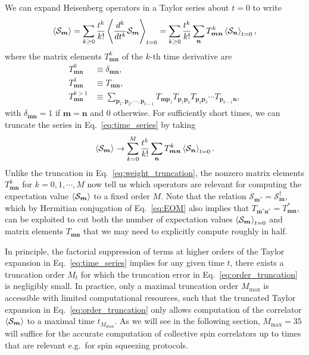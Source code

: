 \documentclass[pra,reprint,longbibliography]{revtex4-1}
\renewcommand{\t}{\text} %
\newcommand{\f}[2]{\dfrac{#1}{#2}} %
\renewcommand{\v}{\bm} %
\newcommand{\bk}{\Braket} %
\renewcommand{\S}{\mathcal{S}}
\newcommand{\1}{\mathds{1}}
\begin{document}
We can expand Heisenberg operators in a Taylor series about $t=0$ to
write
\begin{align}
  \bk{\S_{\v m}}
  = \sum_{k\ge0} \f{t^k}{k!} \bk{\f{d^k}{dt^k} \S_{\v m}}_{t=0}
  = \sum_{k\ge0} \f{t^k}{k!}
  \sum_{\v n} T^k_{\v m\v n} \bk{\S_{\v n}}_{t=0},
  \label{eq:time_series}
\end{align}
where the matrix elements $T^k_{\v m\v n}$ of the $k$-th time
derivative are
\begin{align}
  T^0_{\v m\v n} &\equiv \delta_{\v m\v n}, \\
  T^1_{\v m\v n} &\equiv T_{\v m\v n}, \\
  T^{k>1}_{\v m\v n}
  &\equiv \sum_{\v p_1,\v p_2,\cdots,\v p_{k-1}}
  T_{\v m\v p_1} T_{\v p_1\v p_2} T_{\v p_2\v p_3}
  \cdots T_{\v p_{k-1}\v n},
\end{align}
with $\delta_{\v m\v n}=1$ if $\v m=\v n$ and 0 otherwise.  For
sufficiently short times, we can truncate the series in
Eq.~\eqref{eq:time_series} by taking
\begin{align}
  \bk{\S_{\v m}}
  \to \sum_{k=0}^M \f{t^k}{k!}
  \sum_{\v n} T^k_{\v m\v n} \bk{\S_{\v n}}_{t=0}.
  \label{eq:order_truncation}
\end{align}
Unlike the truncation in Eq.~\eqref{eq:weight_truncation}, the nonzero
matrix elements $T^k_{\v m\v n}$ for $k=0,1,\cdots,M$ now tell us
which operators are relevant for computing the expectation value
$\bk{\S_{\v m}}$ to a fixed order $M$.  Note that the relation
$\S_{\v m^*}=\S_{\v m}^\dag$, which by Hermitian conjugation of
Eq.~\eqref{eq:EOM} also implies that
$T_{\v m^*\v n^*}=T_{\v m\v n}^*$, can be exploited to cut both the
number of expectation values $\bk{\S_{\v m}}_{t=0}$ and matrix
elements $T_{\v m\v n}$ that we may need to explicitly compute roughly
in half.

In principle, the factorial suppression of terms at higher orders of
the Taylor expansion in Eq.~\eqref{eq:time_series} implies for any
given time $t$, there exists a truncation order $M_t$ for which the
truncation error in Eq.~\eqref{eq:order_truncation} is negligibly
small.  In practice, only a maximal truncation order $M_{\t{max}}$ is
accessible with limited computational resources, such that the
truncated Taylor expansion in Eq.~\eqref{eq:order_truncation} only
allows computation of the correlator $\bk{\S_{\v m}}$ to a maximal
time $t_{M_{\t{max}}}$.  As we will see in the following section,
$M_{\t{max}}=35$ will suffice for the accurate computation of
collective spin correlators up to times that are relevant e.g.~for
spin squeezing protocols.
\end{document}
